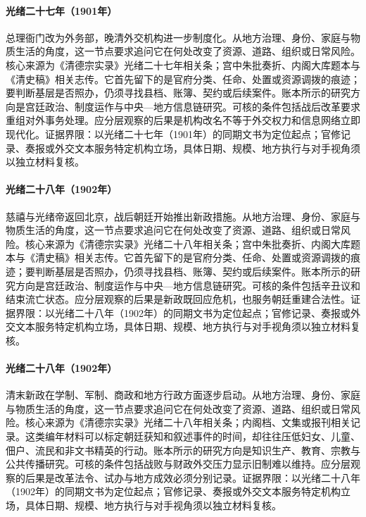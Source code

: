 \hypertarget{social:EQ-1901-ZONGLI-YAMEN-REPLACED}{}\paragraph{光绪二十七年（1901年）}总理衙门改为外务部，晚清外交机构进一步制度化。从地方治理、身份、家庭与物质生活的角度，这一节点要求追问它在何处改变了资源、道路、组织或日常风险。核心来源为《清德宗实录》光绪二十七年相关条；宫中朱批奏折、内阁大库题本与《清史稿》相关志传。它首先留下的是官府分类、任命、处置或资源调拨的痕迹；要判断基层是否照办，仍须寻找县档、账簿、契约或后续案件。账本所示的研究方向是宫廷政治、制度运作与中央—地方信息链研究。可核的条件包括战后改革要求重组对外事务处理。应分层观察的后果是机构改名不等于外交权力和信息网络立即现代化。证据界限：以光绪二十七年（1901年）的同期文书为定位起点；官修记录、奏报或外交文本服务特定机构立场，具体日期、规模、地方执行与对手视角须以独立材料复核。
\hypertarget{social:EQ-1902-CIXI-RETURN-BEIJING}{}\paragraph{光绪二十八年（1902年）}慈禧与光绪帝返回北京，战后朝廷开始推出新政措施。从地方治理、身份、家庭与物质生活的角度，这一节点要求追问它在何处改变了资源、道路、组织或日常风险。核心来源为《清德宗实录》光绪二十八年相关条；宫中朱批奏折、内阁大库题本与《清史稿》相关志传。它首先留下的是官府分类、任命、处置或资源调拨的痕迹；要判断基层是否照办，仍须寻找县档、账簿、契约或后续案件。账本所示的研究方向是宫廷政治、制度运作与中央—地方信息链研究。可核的条件包括辛丑议和结束流亡状态。应分层观察的后果是新政既回应危机，也服务朝廷重建合法性。证据界限：以光绪二十八年（1902年）的同期文书为定位起点；官修记录、奏报或外交文本服务特定机构立场，具体日期、规模、地方执行与对手视角须以独立材料复核。
\hypertarget{social:EQ-1902-NEW-POLICIES-EDUCATION}{}\paragraph{光绪二十八年（1902年）}清末新政在学制、军制、商政和地方行政方面逐步启动。从地方治理、身份、家庭与物质生活的角度，这一节点要求追问它在何处改变了资源、道路、组织或日常风险。核心来源为《清德宗实录》光绪二十八年相关条；内阁档、文集或报刊相关记录。这类编年材料可以标定朝廷获知和叙述事件的时间，却往往压低妇女、儿童、佃户、流民和非文书精英的行动。账本所示的研究方向是知识生产、教育、宗教与公共传播研究。可核的条件包括战败与财政外交压力显示旧制难以维持。应分层观察的后果是改革法令、试办与地方成效必须分别记录。证据界限：以光绪二十八年（1902年）的同期文书为定位起点；官修记录、奏报或外交文本服务特定机构立场，具体日期、规模、地方执行与对手视角须以独立材料复核。
